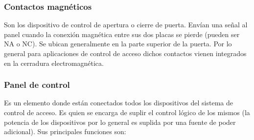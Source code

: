 \subsubsection{Contactos magnéticos}

Son los dispositivo de control de apertura o cierre de puerta. Envían una señal al panel cuando la conexión magnética entre sus dos placas se pierde (pueden ser NA o NC). Se ubican generalmente en la parte superior de la puerta. Por lo general para aplicaciones de control de acceso dichos contactos vienen integrados en la cerradura electromagnética. \cite{CIEMI}

\newpage
\subsubsection{Panel de control}

Es un elemento donde están conectados todos los dispositivos del sistema de control de acceso. Es quien se encarga de suplir el control lógico de los mismos (la potencia de los dispositivos por lo general es suplida por una fuente de poder adicional). Sus principales funciones son: \cite{CIEMI}

